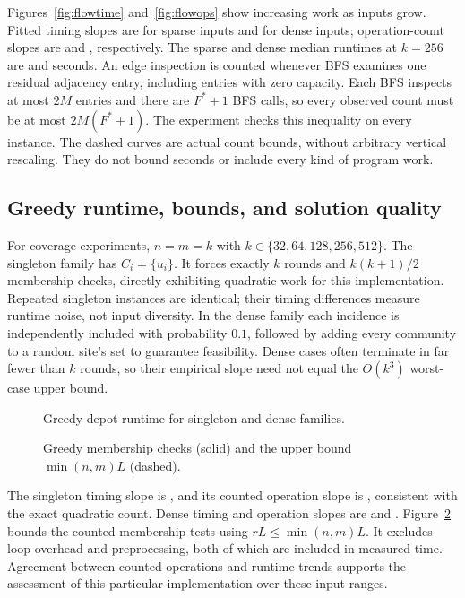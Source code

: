 \documentclass[sigconf,nonacm]{acmart}
\begin{document}
Figures~\ref{fig:flowtime} and~\ref{fig:flowops} show increasing work as inputs
grow. Fitted timing slopes are \FlowSparseTimingSlope{} for sparse inputs
and \FlowDenseTimingSlope{} for dense inputs; operation-count slopes are
\FlowSparseOperationSlope{} and \FlowDenseOperationSlope{}, respectively.
The sparse and dense median runtimes at $k=256$ are
\FlowSparseLargestSeconds{} and \FlowDenseLargestSeconds{} seconds.
An edge inspection is counted whenever BFS examines one residual adjacency
entry, including entries with zero capacity. Each BFS inspects at most $2M$
entries and there are $F^*+1$ BFS calls, so every observed count must be at
most $2M(F^*+1)$. The experiment checks this inequality on every instance.
The dashed curves are actual count bounds, without arbitrary vertical
rescaling. They do not bound seconds or include every kind of program work.

\subsection{Greedy runtime, bounds, and solution quality}
For coverage experiments, $n=m=k$ with
$k\in\{32,64,128,256,512\}$. The singleton family has $C_i=\{u_i\}$.
It forces exactly $k$ rounds and $k(k+1)/2$ membership checks, directly
exhibiting quadratic work for this implementation. Repeated singleton
instances are identical; their timing differences measure runtime noise,
not input diversity. In the dense family each incidence is independently
included with probability $0.1$, followed by adding every community to a
random site's set to guarantee feasibility. Dense cases often terminate in
far fewer than $k$ rounds, so their empirical slope need not equal the
$O(k^3)$ worst-case upper bound.

\begin{figure}[t]
\centering
\caption{Greedy depot runtime for singleton and dense families.}
\label{fig:covertime}
\end{figure}
\begin{figure}[t]
\centering
\caption{Greedy membership checks (solid) and the upper bound
$\min(n,m)L$ (dashed).}\label{fig:coverops}
\end{figure}

The singleton timing slope is \CoverSingletonTimingSlope{}, and its counted
operation slope is \CoverSingletonOperationSlope{}, consistent with the
exact quadratic count. Dense timing and operation slopes are
\CoverDenseTimingSlope{} and \CoverDenseOperationSlope{}.
Figure~\ref{fig:coverops} bounds the counted membership tests using
$rL\le\min(n,m)L$. It excludes loop overhead and preprocessing, both of
which are included in measured time. Agreement between counted operations
and runtime trends supports the assessment of this particular implementation
over these input ranges.
\end{document}
